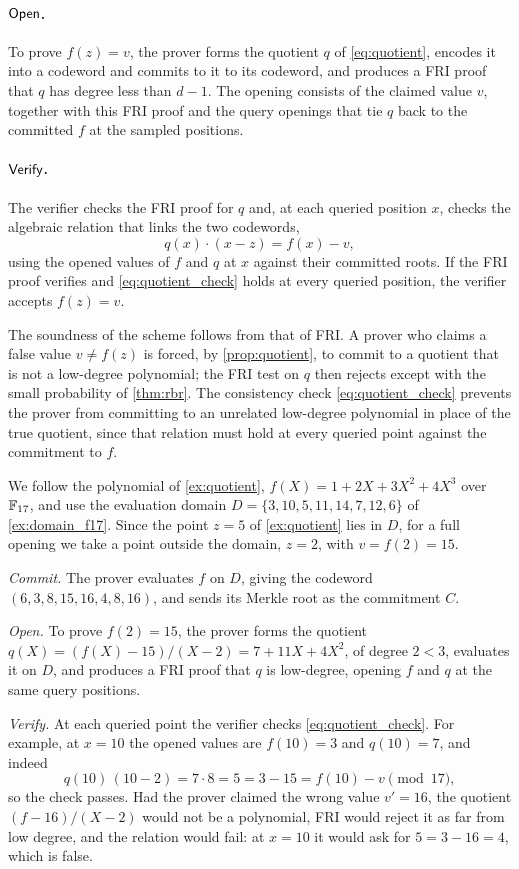 \paragraph{$\mathsf{Open}$.} To prove $f(z) = v$, the prover forms the quotient
$q$ of \cref{eq:quotient}, encodes it into a codeword and commits to it to its codeword, and produces a FRI
proof that $q$ has degree less than $d - 1$. The opening consists of the
claimed value $v$, together with this FRI proof and the query openings
that tie $q$ back to the committed $f$ at the sampled positions.

\paragraph{$\mathsf{Verify}$.} The verifier checks the FRI proof for $q$ and, at
each queried position $x$, checks the algebraic relation that links the
two codewords,
%
\begin{equation}
\label{eq:quotient_check}
q(x) \cdot (x - z) = f(x) - v,
\end{equation}
%
using the opened values of $f$ and $q$ at $x$ against their committed
roots. If the FRI proof verifies and \cref{eq:quotient_check} holds at
every queried position, the verifier accepts $f(z) = v$.

The soundness of the scheme follows from that of FRI. A prover who claims
a false value $v \neq f(z)$ is forced, by \cref{prop:quotient}, to commit
to a quotient that is not a low-degree polynomial; the FRI test on $q$
then rejects except with the small probability of \cref{thm:rbr}. The
consistency check \cref{eq:quotient_check} prevents the prover from
committing to an unrelated low-degree polynomial in place of the true
quotient, since that relation must hold at every queried point against
the commitment to $f$.

\begin{example}
\label{ex:pcs_full}
We follow the polynomial of \cref{ex:quotient},
$f(X) = 1 + 2X + 3X^2 + 4X^3$ over $\mathbb{F}_{17}$, and use the evaluation
domain $D = \{3, 10, 5, 11, 14, 7, 12, 6\}$ of \cref{ex:domain_f17}.
Since the point $z = 5$ of \cref{ex:quotient} lies in $D$, for a full
opening we take a point outside the domain, $z = 2$, with
$v = f(2) = 15$.

\emph{Commit.} The prover evaluates $f$ on $D$, giving the codeword
$(6, 3, 8, 15, 16, 4, 8, 16)$, and sends its Merkle root as the
commitment $C$.

\emph{Open.} To prove $f(2) = 15$, the prover forms the quotient
$q(X) = (f(X) - 15)/(X - 2) = 7 + 11X + 4X^2$, of degree $2 < 3$,
evaluates it on $D$, and produces a FRI proof that $q$ is low-degree,
opening $f$ and $q$ at the same query positions.

\emph{Verify.} At each queried point the verifier checks
\cref{eq:quotient_check}. For example, at $x = 10$ the opened values are
$f(10) = 3$ and $q(10) = 7$, and indeed
%
\[
q(10)\,(10 - 2) = 7 \cdot 8 = 5 = 3 - 15 = f(10) - v \pmod{17},
\]
%
so the check passes. Had the prover claimed the wrong value
$v' = 16$, the quotient $(f - 16)/(X - 2)$ would not be a polynomial,
FRI would reject it as far from low degree, and the relation would fail:
at $x = 10$ it would ask for $5 = 3 - 16 = 4$, which is false.
\end{example}